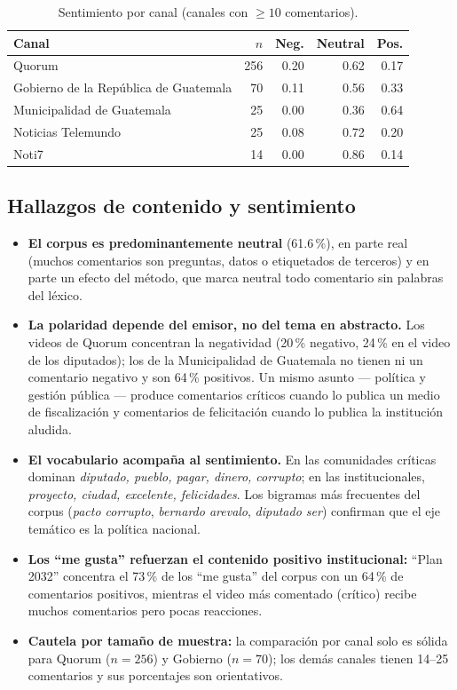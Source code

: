 \documentclass[11pt,a4paper]{article}
\begin{document}
\begin{table}[H]
\centering
\caption{Sentimiento por canal (canales con $\geq 10$ comentarios).}
\small
\begin{tabular}{l r r r r}
\toprule
Canal & $n$ & Neg. & Neutral & Pos. \\
\midrule
Quorum & 256 & 0.20 & 0.62 & 0.17 \\
Gobierno de la Rep\'ublica de Guatemala & 70 & 0.11 & 0.56 & 0.33 \\
Municipalidad de Guatemala & 25 & 0.00 & 0.36 & 0.64 \\
Noticias Telemundo & 25 & 0.08 & 0.72 & 0.20 \\
Noti7 & 14 & 0.00 & 0.86 & 0.14 \\
\bottomrule
\end{tabular}
\end{table}

\subsection{Hallazgos de contenido y sentimiento}
\begin{itemize}[leftmargin=1.4em,itemsep=2pt]
\item \textbf{El corpus es predominantemente neutral} (61.6\,\%), en parte real (muchos comentarios
son preguntas, datos o etiquetados de terceros) y en parte un efecto del m\'etodo, que marca neutral
todo comentario sin palabras del l\'exico.
\item \textbf{La polaridad depende del emisor, no del tema en abstracto.} Los videos de Quorum
concentran la negatividad (20\,\% negativo, 24\,\% en el video de los diputados); los de la
Municipalidad de Guatemala no tienen ni un comentario negativo y son 64\,\% positivos. Un mismo asunto
--- pol\'itica y gesti\'on p\'ublica --- produce comentarios cr\'iticos cuando lo publica un medio de
fiscalizaci\'on y comentarios de felicitaci\'on cuando lo publica la instituci\'on aludida.
\item \textbf{El vocabulario acompa\~na al sentimiento.} En las comunidades cr\'iticas dominan
\emph{diputado, pueblo, pagar, dinero, corrupto}; en las institucionales, \emph{proyecto, ciudad,
excelente, felicidades}. Los bigramas m\'as frecuentes del corpus (\emph{pacto corrupto},
\emph{bernardo arevalo}, \emph{diputado ser}) confirman que el eje tem\'atico es la pol\'itica
nacional.
\item \textbf{Los ``me gusta'' refuerzan el contenido positivo institucional:} ``Plan 2032'' concentra
el 73\,\% de los ``me gusta'' del corpus con un 64\,\% de comentarios positivos, mientras el video m\'as
comentado (cr\'itico) recibe muchos comentarios pero pocas reacciones.
\item \textbf{Cautela por tama\~no de muestra:} la comparaci\'on por canal solo es s\'olida para
Quorum ($n=256$) y Gobierno ($n=70$); los dem\'as canales tienen 14--25 comentarios y sus porcentajes
son orientativos.
\end{itemize}
\end{document}

